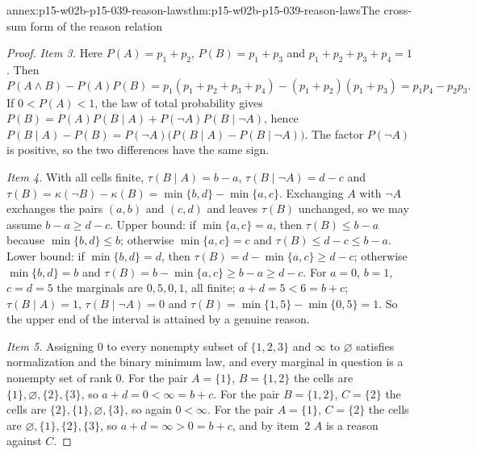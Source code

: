 \begin{annexitem}{annex:p15-w02b-p15-039-reason-laws}{thm:p15-w02b-p15-039-reason-laws}{The cross-sum form of the reason relation}
\begin{proof}
\emph{Item 3.}  Here \(P(A)=p_1+p_2\), \(P(B)=p_1+p_3\) and
\(p_1+p_2+p_3+p_4=1\).  Then
\[
 P(A\land B)-P(A)P(B)
 =p_1(p_1+p_2+p_3+p_4)-(p_1+p_2)(p_1+p_3)
 =p_1p_4-p_2p_3 .
\]
If \(0<P(A)<1\), the law of total probability gives
\(P(B)=P(A)P(B\mid A)+P(\neg A)P(B\mid\neg A)\), hence
\(P(B\mid A)-P(B)=P(\neg A)\bigl(P(B\mid A)-P(B\mid\neg A)\bigr)\).
The factor \(P(\neg A)\) is positive, so the two differences have the same
sign.

\emph{Item 4.}  With all cells finite, \(\tau(B\mid A)=b-a\),
\(\tau(B\mid\neg A)=d-c\) and
\(\tau(B)=\kappa(\neg B)-\kappa(B)=\min\{b,d\}-\min\{a,c\}\).
Exchanging \(A\) with \(\neg A\) exchanges the pairs \((a,b)\) and
\((c,d)\) and leaves \(\tau(B)\) unchanged, so we may assume
\(b-a\geq d-c\).  Upper bound: if \(\min\{a,c\}=a\), then
\(\tau(B)\leq b-a\) because \(\min\{b,d\}\leq b\); otherwise
\(\min\{a,c\}=c\) and \(\tau(B)\leq d-c\leq b-a\).
Lower bound: if \(\min\{b,d\}=d\), then
\(\tau(B)=d-\min\{a,c\}\geq d-c\); otherwise \(\min\{b,d\}=b\) and
\(\tau(B)=b-\min\{a,c\}\geq b-a\geq d-c\).
For \(a=0\), \(b=1\), \(c=d=5\) the marginals are \(0,5,0,1\), all
finite; \(a+d=5<6=b+c\); \(\tau(B\mid A)=1\), \(\tau(B\mid\neg A)=0\) and
\(\tau(B)=\min\{1,5\}-\min\{0,5\}=1\).  So the upper end of the interval
is attained by a genuine reason.

\emph{Item 5.}  Assigning \(0\) to every nonempty subset of \(\{1,2,3\}\)
and \(\infty\) to \(\varnothing\) satisfies normalization and the binary
minimum law, and every marginal in question is a nonempty set of rank
\(0\).  For the pair \(A=\{1\}\), \(B=\{1,2\}\) the cells are
\(\{1\},\varnothing,\{2\},\{3\}\), so \(a+d=0<\infty=b+c\).  For the pair
\(B=\{1,2\}\), \(C=\{2\}\) the cells are \(\{2\},\{1\},\varnothing,\{3\}\),
so again \(0<\infty\).  For the pair \(A=\{1\}\), \(C=\{2\}\) the cells
are \(\varnothing,\{1\},\{2\},\{3\}\), so \(a+d=\infty>0=b+c\), and by
item~2 \(A\) is a reason against \(C\).
\end{proof}
\end{annexitem}


